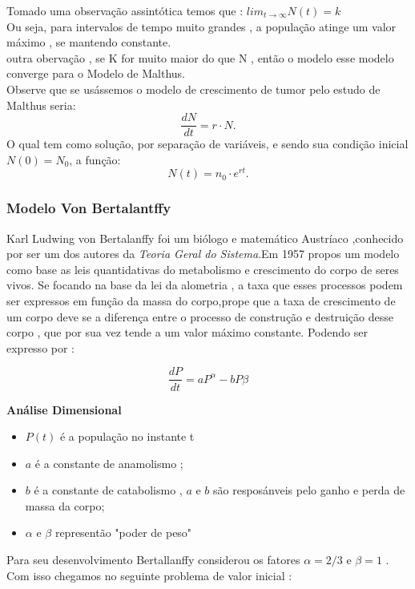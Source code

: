 Tomado uma observação assintótica temos que :
$lim_{t\to \infty} N(t)=k$\\

Ou seja, para  intervalos de tempo muito grandes , a população atinge um valor máximo , se mantendo constante.\\
outra obervação , se K for muito maior do que N , então o modelo esse modelo converge para o Modelo de Malthus.\\

Observe que se usássemos o modelo de crescimento de tumor pelo estudo de Malthus seria:
\begin{equation*}
\dfrac{dN}{dt} = r \cdot N.
\end{equation*}
O qual tem como solução, por separação de variáveis, e sendo sua condição inicial $N(0)=N_0$, a função:
\begin{equation*}
N(t) = n_0\cdot e^{rt}.
\end{equation*}


\newpage
\subsubsection{ Modelo Von Bertalantffy}

Karl Ludwing von Bertalanffy foi um biólogo e matemático Austríaco ,conhecido por ser um dos autores da \textit{Teoria Geral do Sistema}.Em
 1957 propos um modelo como base as leis quantidativas do metabolismo e crescimento do corpo de seres vivos. Se focando na base da lei da alometria , a taxa que esses processos podem ser expressos em função da massa do corpo,prope que a taxa de crescimento de um corpo deve se a diferença entre o processo de construção e destruição desse corpo , que por sua vez tende a um valor máximo constante. Podendo ser expresso por :

\begin{equation*}
    \frac{dP}{dt} =aP^{\alpha}-bP{\beta}
\end{equation*}

\textbf{Análise Dimensional}
\begin{itemize}
    \item $P(t)$ é a população no instante t
    \item $a$ é a  constante de anamolismo ;
    \item $b$ é a  constante de catabolismo , 
 $a$ e $b$ são resposánveis pelo ganho e perda de massa da corpo;
    \item $\alpha$ e $\beta$ representão "poder de peso"
\end{itemize}
Para seu desenvolvimento Bertallanffy considerou os fatores $\alpha = 2/3$ e $\beta=1$ . Com isso chegamos no seguinte problema de valor inicial :

